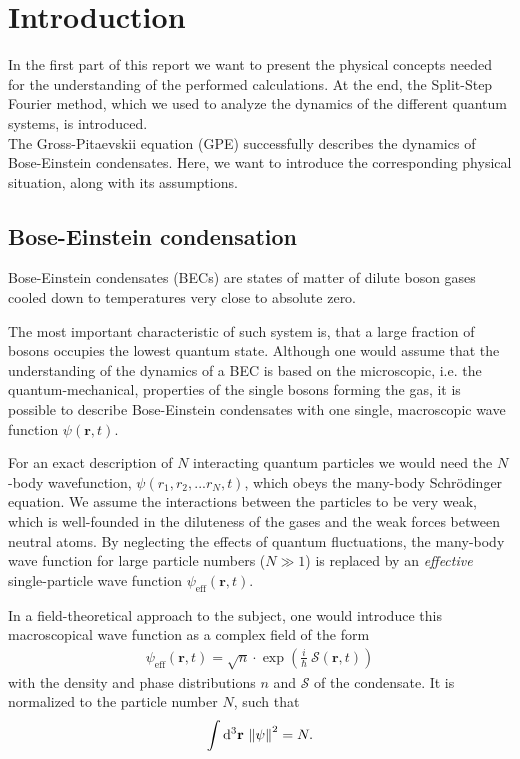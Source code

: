 \section{Introduction}
In the first part of this report we want to present the physical concepts needed for the understanding of the performed calculations. At the end, the Split-Step Fourier method, which we used to analyze the dynamics of the different quantum systems, is introduced. \\

The Gross-Pitaevskii equation (GPE) successfully describes the dynamics of Bose-Einstein condensates. Here, we want to introduce the corresponding physical situation, along with its assumptions.

\subsection{Bose-Einstein condensation}

Bose-Einstein condensates (BECs) are states of matter of dilute boson gases cooled down to temperatures very close to absolute zero.

The most important characteristic of such system is, that a large fraction of bosons occupies the lowest quantum state.
Although one would assume that the understanding of the dynamics of a BEC is based on the microscopic, i.e. the quantum-mechanical, properties of the single bosons forming the gas, it is possible to describe Bose-Einstein condensates with one single, macroscopic wave function $\psi(\mathbf{r},t)$.

For an exact description of $N$ interacting quantum particles we would need the $N$-body wavefunction, $\psi(r_1, r_2, ...r_N , t)$, which obeys the many-body Schr\"odinger equation.
We assume the interactions between the particles to be very weak, which is well-founded in the diluteness of the gases and the weak forces between neutral atoms. 
By neglecting the effects of quantum fluctuations, the many-body wave function for large particle numbers ($N \gg 1$) is replaced by an \textit{effective} single-particle wave function $\psi_{\text{eff}}(\mathbf{r},t).$ 

In a field-theoretical approach to the subject, one would introduce this macroscopical wave function as a complex field of the form
\begin{align}
	\psi_{\text{eff}}(\mathbf{r},t) = \sqrt{n} \cdot \exp(\frac{i}{\hbar} \ \mathcal{S}(\mathbf{r},t))\label{eqn:Field equation}
\end{align}
 with the density and phase distributions $n$ and $\mathcal{S}$ of the condensate. It is normalized to the particle number $N$, such that
 \begin{align}
 	\int \dd[3]\mathbf{r} \ \norm{\psi}^2 = N.
 \end{align}

